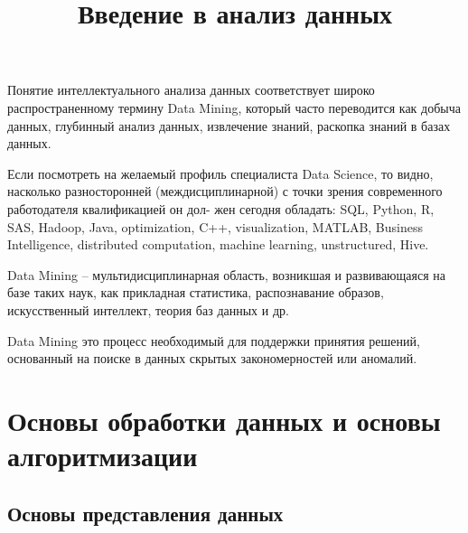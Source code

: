 \documentclass{beamer}
\title{Введение в анализ данных}
\begin{document}
\maketitle




 


\begin{frame}
Понятие интеллектуального анализа данных соответствует широко
распространенному термину Data Mining, который часто переводится как
добыча данных, глубинный анализ данных, извлечение знаний, раскопка
знаний в базах данных.
\end{frame}

\begin{frame}

Если посмотреть на желаемый профиль специалиста Data Science, то видно, насколько разносторонней (междисциплинарной) с
точки зрения современного работодателя квалификацией он дол-
жен сегодня обладать: 
SQL, Python, R,  SAS, Hadoop, Java, 
optimization, C++, visualization, MATLAB,  Business Intelligence, 
distributed computation, 
machine learning, 
unstructured,
Hive.


\end{frame}


\begin{frame}

Data Mining -- мультидисциплинарная область, возникшая и развивающаяся на базе таких наук, 
как прикладная статистика, распознавание образов, искусственный интеллект, теория баз данных и др.

 Data Mining это процесс необходимый для  поддержки принятия решений, основанный на
поиске в данных скрытых закономерностей или аномалий.

\end{frame}
 


\section{Основы обработки данных и  основы алгоритмизации}

\subsection{Основы представления данных}
\end{document}
